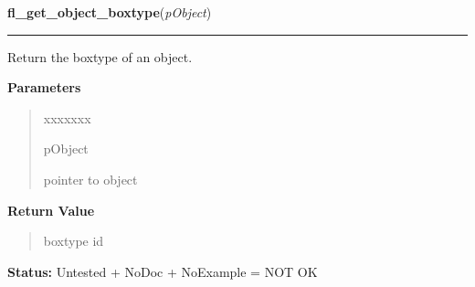 \hspace{.8\funcindent}\begin{boxedminipage}{\funcwidth}

    \raggedright \textbf{fl\_get\_object\_boxtype}(\textit{pObject})

    \vspace{-1.5ex}

    \rule{\textwidth}{0.5\fboxrule}
\setlength{\parskip}{2ex}
    Return the boxtype of an object.

\setlength{\parskip}{1ex}
      \textbf{Parameters}
      \vspace{-1ex}

      \begin{quote}
        \begin{Ventry}{xxxxxxx}

          \item[pObject]

          pointer to object

        \end{Ventry}

      \end{quote}

      \textbf{Return Value}
    \vspace{-1ex}

      \begin{quote}
      boxtype id

      \end{quote}

\textbf{Status:} Untested + NoDoc + NoExample = NOT OK



    \end{boxedminipage}

    \label{xformslib:library:fl_set_object_bw}

    \vspace{0.5ex}

